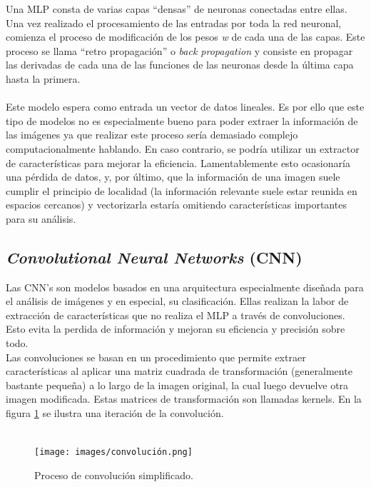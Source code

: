 Una MLP consta de varias capas ``densas'' de neuronas conectadas entre ellas. Una vez 
realizado el procesamiento de las entradas por toda la red neuronal, comienza el 
proceso de modificación de los pesos \textit{w} de cada una de las capas. Este proceso 
se llama ``retro propagación'' o \textit{back propagation} y consiste en propagar las 
derivadas de cada una de las funciones de las neuronas desde la última capa hasta 
la primera.\\\\

Este modelo espera como entrada un vector de datos lineales. Es por ello que este tipo 
de modelos no es especialmente bueno para poder extraer la información de las imágenes 
ya que realizar este proceso sería demasiado complejo computacionalmente hablando. 
En caso contrario, se podría utilizar un extractor de características para mejorar la 
eficiencia. Lamentablemente esto ocasionaría una pérdida de datos, y, por último, 
que la información de una imagen suele cumplir el principio de localidad (la información 
relevante suele estar reunida en espacios cercanos) y vectorizarla estaría omitiendo 
características importantes para su análisis.

\subsection{\textit{Convolutional Neural Networks} (CNN)}

Las CNN's son modelos basados en una arquitectura especialmente diseñada para el 
análisis de imágenes y en especial, su clasificación. Ellas realizan la labor de 
extracción de características que no realiza el MLP a través de convoluciones. Esto 
evita la perdida de información y mejoran su eficiencia y precisión sobre todo. \\

Las convoluciones se basan en un procedimiento que permite extraer características al 
aplicar una matriz cuadrada de transformación (generalmente bastante pequeña) a lo 
largo de la imagen original, la cual luego devuelve otra imagen modificada. Estas 
matrices de transformación son llamadas kernels. En la figura \ref{convolucion} se 
ilustra una iteración de la convolución.
\\\\
\begin{figure}[h!]
\texttt{[image: images/convolución.png]}
\centering
\caption{Proceso de convolución simplificado\protect\cite{convoluciones}.}
\label{convolucion}
\end{figure}

